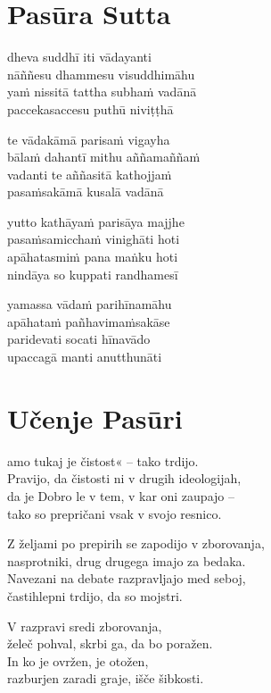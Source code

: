 

\cleartoverso
\chapter*{Pasūra Sutta}

dheva suddhī iti vādayanti\\
nāññesu dhammesu visuddhimāhu\\
yaṁ nissitā tattha subhaṁ vadānā\\
paccekasaccesu puthū niviṭṭhā

te vādakāmā parisaṁ vigayha\\
bālaṁ dahantī mithu aññamaññaṁ\\
vadanti te aññasitā kathojjaṁ\\
pasaṁsakāmā kusalā vadānā

yutto kathāyaṁ parisāya majjhe\\
pasaṁsamicchaṁ vinighāti hoti\\
apāhatasmiṁ pana maṅku hoti\\
nindāya so kuppati randhamesī

yamassa vādaṁ parihīnamāhu\\
apāhataṁ pañhavimaṁsakāse\\
paridevati socati hīnavādo\\
upaccagā manti anutthunāti


\cleartorecto
\chapter{Učenje Pasūri}

amo tukaj je čistost« -- tako trdijo.\\
Pravijo, da čistosti ni v drugih ideologijah,\\
da je Dobro le v tem, v kar oni zaupajo --\\
tako so prepričani vsak v svojo resnico.

Z željami po prepirih se zapodijo v zborovanja,\\
nasprotniki, drug drugega imajo za bedaka.\\
Navezani na debate razpravljajo med seboj,\\
častihlepni trdijo, da so mojstri.

V razpravi sredi zborovanja,\\
želeč pohval, skrbi ga, da bo poražen.\\
In ko je ovržen, je otožen,\\
razburjen zaradi graje, išče šibkosti.

